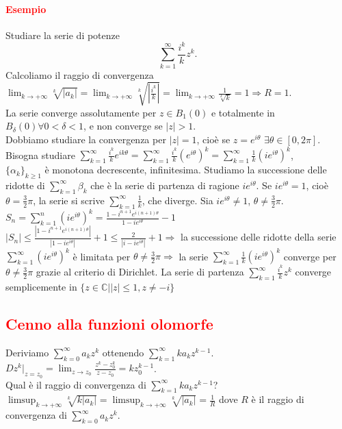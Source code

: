 \documentclass{article}
\newcommand{\C}{\mathbb{C}}
\begin{document}
\paragraph{\textcolor{red}{Esempio}}
Studiare la serie di potenze
\begin{equation*}
    \sum_{k=1}^{\infty}\frac{i^k}{k}z^k.    
\end{equation*}
Calcoliamo il raggio di convergenza $\lim_{k \rightarrow +\infty}\sqrt[k]{|a_k|}=\lim_{k\rightarrow+\infty} \sqrt[k]{|\frac{i^k}{k}|}=\lim_{k \rightarrow +\infty}\frac{1}{\sqrt[k]{k}}=1\Rightarrow R=1$.\\
La serie converge assolutamente per $z \in B_1(0)$ e totalmente in $B_\delta (0)\forall 0 < \delta<1$, e non converge se $|z|>1$.\\ Dobbiamo studiare la convergenza per $|z|= 1$, cioè se $z =e^{i\theta}$ $\exists \theta \in [0,2\pi]$. Bisogna studiare $\sum_{k=1}^{\infty}\frac{i^k}{k}e^{ik\theta}=\sum_{k=1}^{\infty}\frac{i^k}{k}(e^{i\theta})^k=\sum_{k=1}^{\infty}\frac{1}{k}(ie^{i\theta})^k$,\\
$\{\alpha_k\}_{k \geq 1}$ è monotona decrescente, infinitesima. Studiamo la successione delle ridotte di $\sum_{k=1}^{\infty}\beta_k $ che è la serie di partenza di ragione $ie^{i\theta}$. Se $i e^{i\theta}=1$, cioè $\theta =\frac{3}{2}\pi$, la serie si scrive $\sum_{k=1}^{\infty}\frac{1}{k}$, che diverge. Sia $i e^{i\theta}\neq 1$, $\theta \neq \frac{3}{2}\pi$. $S_n=\sum_{k=1}^{n}(ie^{i\theta})^k=\frac{1-i^{n+1}e^{i(n+1)\theta}}{1-ie^{i\theta}}-1$\\
$|S_n|\leq \frac{|1-i^{n+1}e^{i(n+1)\theta}|}{|1-ie^{i\theta}|}+1 \leq \frac{2}{|i -ie^{i\theta}|}+1 \Rightarrow$ la successione delle ridotte della serie $\sum_{k=1}^{\infty}(i e^{i\theta})^k$ è limitata per $\theta \neq \frac{3}{2}\pi \Rightarrow$ la serie $\sum_{k=1}^{\infty}\frac{1}{k}(ie^{i\theta})^k$ converge per $\theta \neq \frac{3}{2}\pi$ grazie al criterio di Dirichlet. La serie di partenza $\sum_{k=1}^{\infty}\frac{i^k}{k}z^k$ converge semplicemente in $\{z \in \C||z|\leq 1, z \neq -i\}$

\subsection{\textcolor{red}{Cenno alla funzioni olomorfe}}
Deriviamo $\sum_{k=0}^{\infty}a_kz^k$ ottenendo $\sum_{k=1}^{\infty}ka_kz^{k-1}$.\\
$Dz^k|_{z=z_0}=\lim_{z \rightarrow z_0} \frac{z^k-z_0^k}{z-z_0}=kz_0^{k-1}$.\\
Qual è il raggio di convergenza di $\sum_{k=1}^{\infty}ka_k z^{k-1}$?\\
$\limsup_{k \rightarrow +\infty} \sqrt[k]{k|a_k|}=\limsup_{k \rightarrow +\infty}\sqrt[k]{|a_k|}=\frac{1}{R}$ dove $R$ è il raggio di convergenza di $\sum_{k=0}^{\infty}a_kz^k$.
\end{document}
